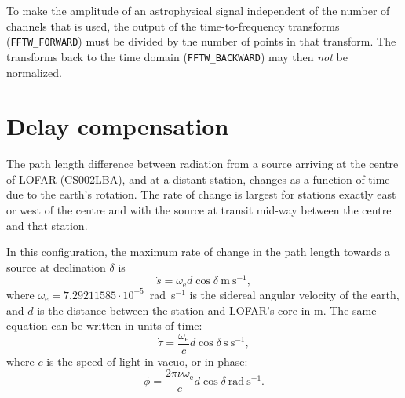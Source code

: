 \documentclass[a4paper,twoside]{article}
\newcommand{\fftwforward}{\texttt{FFTW\_FORWARD}\xspace}
\newcommand{\fftwbackward}{\texttt{FFTW\_BACKWARD}\xspace}
\begin{document}
To make the amplitude of an astrophysical signal independent of the
number of channels that is used, the output of the
time-to-frequency transforms (\fftwforward) must be divided by
the number of points in that transform. The transforms back to the
time domain (\fftwbackward) may then \emph{not} be normalized.





%
%

\section{Delay compensation}
\label{sec:delay-compensation}



The path length difference between radiation from a source arriving at
the centre of LOFAR (CS002LBA), and at a distant station, changes as a
function of time due to the earth's rotation. The rate of change is
largest for stations exactly east or west of the centre and with the
source at transit mid-way between the centre and that station.

In this configuration, the maximum rate of change in the path length
towards a source at declination $\delta$ is
\begin{equation}
\dot{s} = \omega_\mathrm{e} d \cos \delta\ \mathrm{m}\ \mathrm{s}^{-1},
\end{equation}
where $\omega_\mathrm{e} = 7.29211585 \cdot 10^{-5}$~rad~s$^{-1}$ is the
sidereal angular velocity of the earth, and $d$ is the distance
between the station and LOFAR's core in m. The same equation can be
written in units of time:
\begin{equation}
\dot{\tau} = \frac{\omega_\mathrm{e}}{c} d \cos \delta\ \mathrm{s}\ \mathrm{s}^{-1},
\end{equation}
where $c$ is the speed of light in vacuo, or in phase:
\begin{equation}
\dot{\phi} = \frac{2\pi\nu\omega_\mathrm{e}}{c} d \cos \delta\ \mathrm{rad}\ \mathrm{s}^{-1}.
\end{equation}
\end{document}
